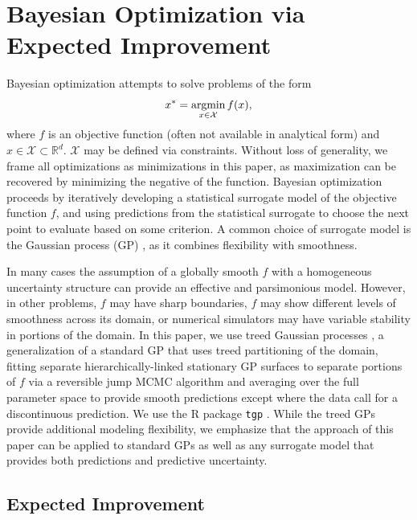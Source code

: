 \documentclass{article}
\newcommand{\argmin}{\operatornamewithlimits{argmin}}
\begin{document}
%
%
\section{Bayesian Optimization via Expected Improvement}
\label{sec:gp}
%
%

Bayesian optimization attempts to solve problems of the form
\[
x^* = \argmin_{x\in\mathcal{X}} f(x),
\]
where $f$ is an objective function (often not available in analytical
form) and $x\in\mathcal{X}\subset\mathbb{R}^d$. $\mathcal{X}$ may be
defined via constraints. Without loss of generality, we frame all
optimizations as minimizations in this paper, as maximization can be
recovered by minimizing the negative of the function. Bayesian
optimization proceeds by iteratively
developing a statistical surrogate model of the objective
function $f$, and using predictions from the statistical surrogate to
choose the next point to evaluate based on some criterion. A
common choice of surrogate model is the Gaussian process (GP)
\cite{gramacy:2020,TonyBook}, as it combines flexibility with smoothness.

In many cases the assumption of a globally smooth $f$ with a homogeneous 
uncertainty structure can provide an effective and parsimonious
model. However, in other problems, $f$ may have 
sharp boundaries, $f$ may show different levels of smoothness across
its domain, or numerical simulators may have variable stability in 
portions of the domain. In this paper, we use treed Gaussian
processes \cite{gpJasa}, a generalization of a standard GP that uses
treed partitioning of the domain, fitting separate hierarchically-linked stationary GP 
surfaces to separate portions of $f$ via a reversible jump MCMC 
algorithm and 
averaging over the full parameter space to provide smooth predictions except 
where the data call for a discontinuous prediction. We use the R package 
\verb|tgp| \citep{tgp2}. While the treed GPs provide additional
modeling flexibility, we emphasize that the approach of this paper can
be applied to standard GPs as well as any surrogate model that
provides both predictions and predictive uncertainty.



%
%
\subsection{Expected Improvement}
%
%
\end{document}
